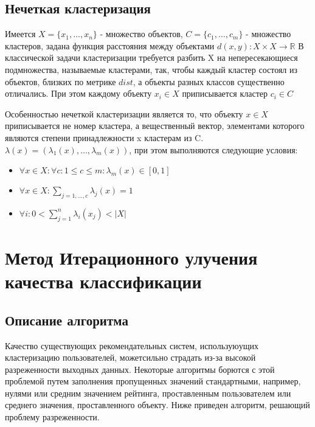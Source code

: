 \documentclass[12pt]{article} %
\begin{document}
\subsection{Нечеткая кластеризация}
Имеется $X=\{x_{1},\dots,x_{n}\}$ - множество объектов, $C=\{c_{1},\dots,c_{m}\}$ - множество кластеров, задана функция расстояния между объектами $d(x, y): X\times X  \to \mathbb{R}$ В классической задачи кластеризации требуется разбить X на непересекающиеся подмножества, называемые кластерами, так, чтобы каждый кластер состоял из объектов, близких по метрике $dist$, а объекты разных классов существенно отличались. При этом каждому объекту $x_{i} \in X$ приписывается кластер $c_{i} \in C$
\par
 Особенностью нечеткой кластеризации является то, что объекту $x \in X$ приписывается не номер кластера, а вещественный вектор, элементами которого являются степени принадлежности x кластерам из C. $\lambda(x)=(\lambda_{1}(x),\dots,\lambda_{m}(x)) $, при этом выполняются следующие условия:
 \begin{itemize}
 \item $\forall x \in X: \forall c: 1\leq c \leq m:  \lambda_{m}(x) \in [0,1]$
 \item $\forall x \in X: \sum_{j=1,\dots,c} \lambda_{j}(x) = 1$
 \item $\forall i : 0 < \sum_{j=1}^{n} \lambda_{i}(x_{j}) < |X|  $
 \end{itemize} 
 \par


\section{Метод Итерационного улучения качества классификации}
\subsection{Описание алгоритма}
Качество существующих рекомендательных систем, используюущих кластеризацию пользователей, можетсильно страдать из-за высокой разреженности выходных данных. Некоторые алгоритмы борются с этой проблемой путем заполнения пропущенных значений стандартными, например, нулями или средним значением рейтинга, проставленным пользователем или среднего значения, проставленного объекту. Ниже приведен алгоритм, решающий проблему разреженности.
\par
\end{document}
